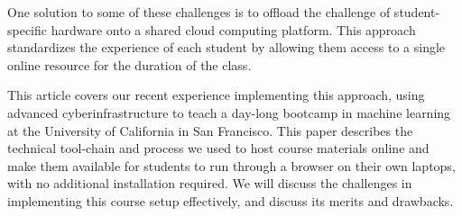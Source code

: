 One solution to some of these challenges is to offload the challenge of
student-specific hardware onto a shared cloud computing platform. This approach
standardizes the experience of each student by allowing them access to a single
online resource for the duration of the class.

This article covers our recent experience implementing this approach, using
advanced cyberinfrastructure to teach a day-long bootcamp in machine learning at
the University of California in San Francisco. This paper describes the
technical tool-chain and process we used to host course materials online and
make them available for students to run through a browser on their own laptops,
with no additional installation required. We will discuss the challenges in
implementing this course setup effectively, and discuss its merits and
drawbacks.
